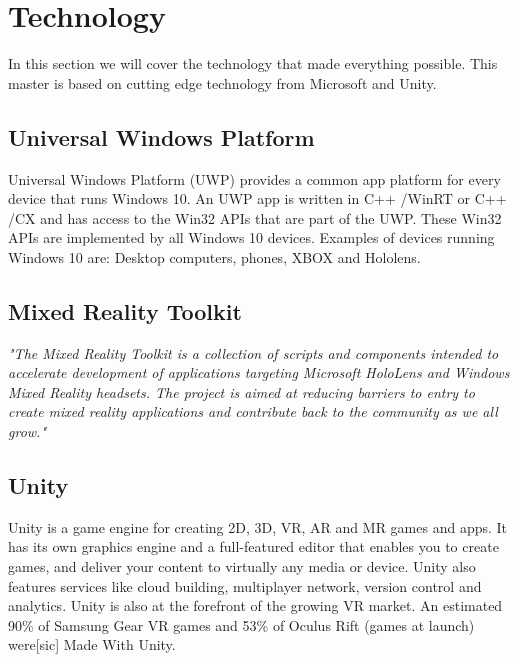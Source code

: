     
    \section{Technology}
    In this section we will cover the technology that made everything possible. This master is based on cutting edge technology from Microsoft and Unity.
    
        \subsection{Universal Windows Platform}
        Universal Windows Platform (UWP) provides a common app platform for every device that runs Windows 10. An UWP app is written in C++ /WinRT or C++ /CX and has access to the Win32 APIs that are part of the UWP. These Win32 APIs are implemented by all Windows 10 devices.\cite{wdc-UWP} Examples of devices running Windows 10 are: Desktop computers, phones, XBOX and Hololens.
        
        \subsection{Mixed Reality Toolkit}
        \emph{"The Mixed Reality Toolkit is a collection of scripts and components intended to accelerate development of applications targeting Microsoft HoloLens and Windows Mixed Reality headsets. The project is aimed at reducing barriers to entry to create mixed reality applications and contribute back to the community as we all grow."}\cite{MRToolkitReadme}
    
        \subsection{Unity}
        Unity is a game engine for creating 2D, 3D, VR, AR and MR games and apps. It has its own graphics engine and a full-featured editor that enables you to create games, and deliver your content to virtually any media or device. Unity also features services like cloud building, multiplayer network, version control and analytics. Unity is also at the forefront of the growing VR market. An estimated 90\% of Samsung Gear VR games and 53\% of Oculus Rift (games at launch) were[sic] Made With Unity. \cite{UnityAbout}
        
